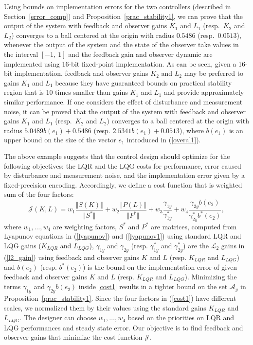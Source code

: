 \documentclass{amsart}
\numberwithin{equation}{section}
\def\myparagraph#1{{\smallskip\noindent{\bf #1}}}
\begin{document}
Using bounds on implementation errors for the two controllers (described in Section~\ref{error_comp})
and Proposition~\ref{prac_stability1}, we can prove that the output of the system with feedback and observer gains $K_1$ and $L_1$ 
(resp.\ $K_2$ and $L_2$) converges to a ball centered at the origin with radius $0.5486$ (resp.\ $0.0513$), 
whenever the output of the system and the state of the observer take values in the interval $[-1,~1]$ and the feedback gain and observer dynamic are implemented 
using 16-bit fixed-point implementation. 
As can be seen, given a 16-bit implementation, feedback and observer gains $K_2$ and $L_2$ may be preferred to gains $K_1$ and $L_1$ 
because they have guaranteed bounds on practical stability region that is 10 times smaller than gains $K_1$ and $L_1$ and provide approximately similar performance. 
If one considers the effect of disturbance and measurement noise, it can be proved that the output of the system with feedback and observer gains 
$K_1$ and $L_1$ (resp.\ $K_2$ and $L_2$) converges to a ball centered at the origin with radius $5.0489b(e_1)+0.5486$ (resp. $2.5341b(e_1)+0.0513$),
where $b(e_1)$ is an upper bound on the size of the vector $e_1$ introduced in (\ref{overal1}).

\myparagraph{Optimization objectives}
The above example suggests that the control design should optimize for the following objectives: 
the LQR and the LQG costs for performance, error caused by disturbance and measurement noise, 
and the implementation error given by a fixed-precision encoding. 
Accordingly, we define a cost function that is weighted sum of the four factors:
\begin{equation}\label{cost1}
\mathcal{J}(K,L) = w_1\frac{\Vert S(K)\Vert}{\Vert S^*\Vert}+w_2\frac{\Vert P(L)\Vert}{\Vert P^*\Vert}+w_3\frac{\gamma_{1y}}{\gamma^*_{1y}}+w_4\frac{\gamma_{2y}b(e_2)}{\gamma^*_{2y}b^*(e_2)},
\end{equation}
where $w_1,\ldots,w_4$ are weighting factors, $S^*$ and $P^*$ are matrices, computed from Lyapunov equations in (\ref{lyapunov}) and (\ref{lyapunov1}) using standard LQR and LQG gains ($K_{LQR}$ and $L_{LQG}$), 
$\gamma_{1y}$ and $\gamma_{2y}$ (resp. $\gamma^*_{1y}$ and $\gamma^*_{2y}$) are the $\mathcal{L}_2$ gains in (\ref{l2_gain}) using feedback and observer gains $K$ and $L$ 
(resp. $K_{LQR}$ and $L_{LQG}$) and $b(e_2)$ (resp. $b^*(e_2)$) is the bound on the implementation error of given feedback and observer gains 
$K$ and $L$ (resp. $K_{LQR}$ and $L_{LQG}$). 
Minimizing the terms $\gamma_{1y}$ and $\gamma_{2y}b(e_2)$ inside \eqref{cost1} results in a tighter bound 
on the set $\mathcal{A}_y$ in Proposition~\ref{prac_stability1}. 
Since the four factors in (\ref{cost1}) have different scales, we normalized them by their values using the standard gains 
$K_{LQR}$ and $L_{LQG}$. 
The designer can choose $w_1,\ldots,w_4$ based on the priorities on LQR and LQG performances and steady state error.
Our objective is to find feedback and observer gains that minimize the cost function $\mathcal{J}$.
\end{document}
